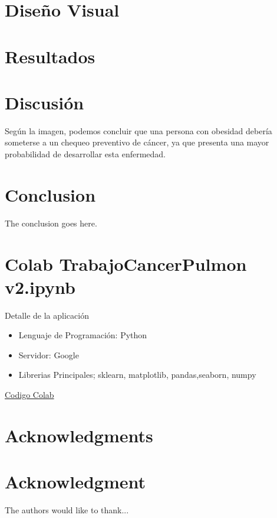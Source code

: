 \documentclass[10pt,journal,compsoc]{IEEEtran}
\begin{document}
\section{Diseño Visual}
\section{Resultados}
\section{Discusión}
Según la imagen, podemos concluir que una persona con obesidad debería someterse a un chequeo preventivo de cáncer, ya que presenta una mayor probabilidad de desarrollar esta enfermedad.

\section{Conclusion}
The conclusion goes here.



\appendices
\section{Colab TrabajoCancerPulmon v2.ipynb}
Detalle de la aplicación
\begin{itemize}
  \item Lenguaje de Programación: Python
  \item Servidor: Google
  \item Librerias Principales; sklearn, matplotlib, pandas,seaborn, numpy
\end{itemize}
\href{https://colab.research.google.com/drive/1-HcDMOWJxGsakeZxqYCUc18EXPyz__4q?usp=sharing}{Codigo Colab}



\ifCLASSOPTIONcompsoc
  \section*{Acknowledgments}
\else
  \section*{Acknowledgment}
\fi


The authors would like to thank...

\ifCLASSOPTIONcaptionsoff
  \newpage
\fi
\end{document}
